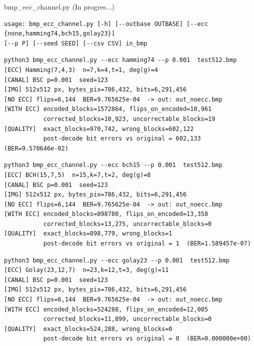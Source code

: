 \documentclass{beamer}
\theoremstyle{plain}
\theoremstyle{example}
\theoremstyle{example}
\begin{document}
\begin{frame}[fragile]  {bmp\_ecc\_channel.py (In progres...)}\tiny  
\begin{verbatim}  
usage: bmp_ecc_channel.py [-h] [--outbase OUTBASE] [--ecc {none,hamming74,bch15,golay23}] 
[--p P] [--seed SEED] [--csv CSV] in_bmp
\end{verbatim}

\begin{verbatim}  
python3 bmp_ecc_channel.py --ecc hamming74 --p 0.001  test512.bmp 
[ECC] Hamming(7,4,3)  n=7,k=4,t=1, deg(g)=4
[CANAL] BSC p=0.001  seed=123
[IMG] 512x512 px, bytes_pix=786,432, bits=6,291,456
[NO ECC] flips=6,144  BER=9.765625e-04  -> out: out_noecc.bmp
[WITH ECC] encoded_blocks=1572864, flips_on_encoded=10,961
           corrected_blocks=10,923, uncorrectable_blocks=19
[QUALITY]  exact_blocks=970,742, wrong_blocks=602,122
           post-decode bit errors vs original = 602,133  (BER=9.570646e-02)
\end{verbatim}

\begin{verbatim}  
python3 bmp_ecc_channel.py --ecc bch15 --p 0.001  test512.bmp  
[ECC] BCH(15,7,5)  n=15,k=7,t=2, deg(g)=8
[CANAL] BSC p=0.001  seed=123
[IMG] 512x512 px, bytes_pix=786,432, bits=6,291,456
[NO ECC] flips=6,144  BER=9.765625e-04  -> out: out_noecc.bmp
[WITH ECC] encoded_blocks=898780, flips_on_encoded=13,358
           corrected_blocks=13,275, uncorrectable_blocks=0
[QUALITY]  exact_blocks=898,779, wrong_blocks=1
           post-decode bit errors vs original = 1  (BER=1.589457e-07)
\end{verbatim}

\begin{verbatim}  
python3 bmp_ecc_channel.py --ecc golay23 --p 0.001  test512.bmp 
[ECC] Golay(23,12,7)  n=23,k=12,t=3, deg(g)=11
[CANAL] BSC p=0.001  seed=123
[IMG] 512x512 px, bytes_pix=786,432, bits=6,291,456
[NO ECC] flips=6,144  BER=9.765625e-04  -> out: out_noecc.bmp
[WITH ECC] encoded_blocks=524288, flips_on_encoded=12,005
           corrected_blocks=11,899, uncorrectable_blocks=0
[QUALITY]  exact_blocks=524,288, wrong_blocks=0
           post-decode bit errors vs original = 0  (BER=0.000000e+00)
\end{verbatim}

\end{frame}
\end{document}
